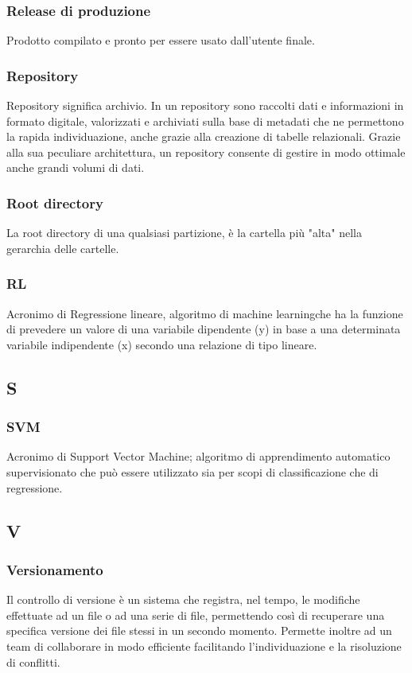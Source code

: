 \subsubsection*{Release di produzione}
Prodotto compilato e pronto per essere usato dall'utente finale.


\subsubsection*{Repository}
Repository significa archivio. In un repository sono raccolti dati e informazioni in formato digitale, valorizzati e archiviati sulla base di metadati che ne permettono la rapida individuazione, anche grazie alla creazione di tabelle relazionali. Grazie alla sua peculiare architettura, un repository consente di gestire in modo ottimale anche grandi volumi di dati.
\subsubsection*{Root directory}
La root directory di una qualsiasi partizione, è la cartella più "alta" nella gerarchia delle cartelle.
\subsubsection*{RL}
Acronimo di Regressione lineare, algoritmo di machine learning\glosp che ha la funzione di prevedere un valore di una variabile dipendente (y) in base a una determinata variabile indipendente (x) secondo una relazione di tipo lineare.
\subsection*{S}
\subsubsection*{SVM}
Acronimo di Support Vector Machine; algoritmo di apprendimento automatico supervisionato che può essere utilizzato sia per scopi di classificazione che di regressione.

\subsection*{V}
\subsubsection*{Versionamento}
Il controllo di versione è un sistema che registra, nel tempo, le modifiche effettuate ad un file o ad una serie di file, permettendo così di recuperare una specifica versione dei file stessi in un secondo momento. Permette inoltre ad un team di collaborare in modo efficiente facilitando l'individuazione e la risoluzione di conflitti.

